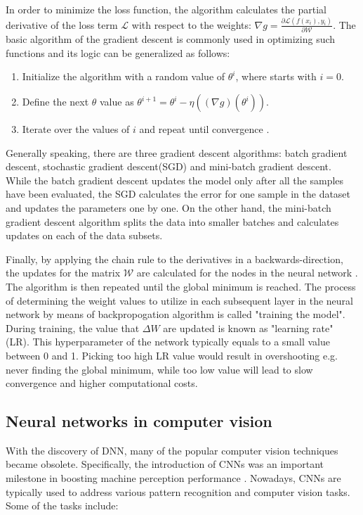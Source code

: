\documentclass[english, 12pt, a4paper, elec, utf8, a-1b, online]{aaltothesis}
\begin{document}
In order to minimize the loss function, the algorithm calculates the partial derivative of the loss term $\mathcal{L}$ with respect to the weights: $\nabla g = \frac{\partial \mathcal{L}(f(x_i), y_i)}{\partial \mathcal{W}}$. The basic algorithm of the gradient descent is commonly used in optimizing such functions and its logic can be generalized as follows: 

\begin{enumerate}
  \item Initialize the algorithm with a random value of $\theta^{i}$, where starts with $i=0$.
  \item Define the next $\theta$ value as $\theta^{i+1} = \theta^{i}-\eta\left((\nabla g)\left(\theta^{i}\right)\right)$.
  \item Iterate over the values of $i$ and repeat until convergence \cite{Albarghouthi2021}.
\end{enumerate} 

Generally speaking, there are three gradient descent algorithms: batch gradient descent, stochastic gradient descent(SGD) and mini-batch gradient descent. While the batch gradient descent updates the model only after all the samples have been evaluated, the SGD calculates the error for one sample in the dataset and updates the parameters one by one. On the other hand, the mini-batch gradient descent algorithm splits the data into smaller batches and calculates updates on each of the data subsets. 

Finally, by applying the chain rule to the derivatives in a backwards-direction, the updates for the matrix $\mathcal{W}$ are calculated for the nodes in the neural network \cite{Alber2018}. The algorithm is then repeated until the global minimum is reached. The process of determining the weight values to utilize in each subsequent layer in the neural network by means of backpropogation algorithm is called "training the model". During training, the value that $\Delta W$ are updated is known as "learning rate" (LR). This hyperparameter of the network typically equals to a small value between 0 and 1. Picking too high LR value would result in overshooting e.g. never finding the global minimum, while too low value will lead to slow convergence and higher computational costs. 


\subsection{Neural networks in computer vision}
\label{neural_nets} 
With the discovery of DNN, many of the popular computer vision techniques became obsolete. Specifically, the introduction of CNNs was an important milestone in boosting machine perception performance \cite{Mahony2019}. Nowadays, CNNs are typically used to address various pattern recognition and computer vision tasks. Some of the tasks  include:
\end{document}
